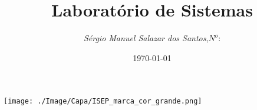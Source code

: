 \begin{titlepage}
\begin{minipage}{0.95\linewidth}
\centering
\texttt{[image: ./Image/Capa/ISEP\_marca\_cor\_grande.png]}
\label{Capa}
\title{Laborat\'{o}rio de Sistemas}
\author{\emph{S\'{e}rgio Manuel Salazar dos Santos},\;$N^o$:}
\date{\today}
\maketitle
\end{minipage}
\end{titlepage}
